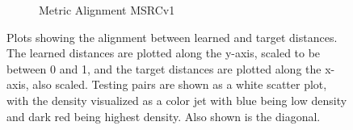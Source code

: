 \begin{figure}[p]
\begin{subfigure}{.5\textwidth}
  \caption{Metric Alignment MSRCv1}
  \label{fig:sub6}
\end{subfigure}
\caption{Plots showing the alignment between learned and target distances. The learned distances are plotted along the y-axis, scaled to be between 0 and 1, and the target distances are plotted along the x-axis, also scaled. Testing pairs are shown as a white scatter plot, with the density visualized as a color jet with blue being low density and dark red being highest density. Also shown is the diagonal.}
\label{fig:alignment}
\end{figure}































